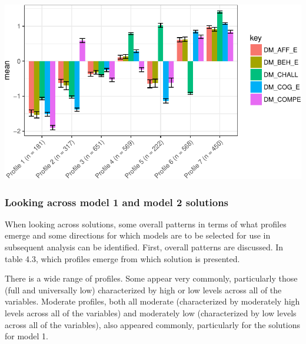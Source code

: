 \documentclass[]{book}
\theoremstyle{definition}
\theoremstyle{definition}
\theoremstyle{definition}
\theoremstyle{remark}
\begin{document}
\begin{center}\includegraphics[width=0.8\linewidth]{rosenberg-dissertation_files/figure-latex/m1_7p-1} \end{center}

\subsubsection{Looking across model 1 and model 2
solutions}\label{looking-across-model-1-and-model-2-solutions}

When looking across solutions, some overall patterns in terms of what
profiles emerge and some directions for which models are to be selected
for use in subsequent analysis can be identified. First, overall
patterns are discussed. In table 4.3, which profiles emerge from which
solution is presented.

There is a wide range of profiles. Some appear very commonly,
particularly those (full and universally low) characterized by high or
low levels across all of the variables. Moderate profiles, both all
moderate (characterized by moderately high levels across all of the
variables) and moderately low (characterized by low levels across all of
the variables), also appeared commonly, particularly for the solutions
for model 1.
\end{document}
